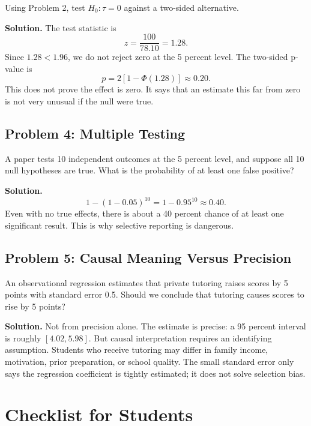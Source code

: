 Using Problem 2, test $H_0:\tau=0$ against a two-sided alternative.

\textbf{Solution.} The test statistic is
\[
  z=\frac{100}{78.10}=1.28.
\]
Since $1.28<1.96$, we do not reject zero at the 5 percent level. The two-sided
p-value is
\[
  p=2[1-\Phi(1.28)]\approx 0.20.
\]
This does not prove the effect is zero. It says that an estimate this far from
zero is not very unusual if the null were true.

\subsection{Problem 4: Multiple Testing}

A paper tests 10 independent outcomes at the 5 percent level, and suppose all
10 null hypotheses are true. What is the probability of at least one false
positive?

\textbf{Solution.}
\[
  1-(1-0.05)^{10}
  =
  1-0.95^{10}
  \approx
  0.40.
\]
Even with no true effects, there is about a 40 percent chance of at least one
significant result. This is why selective reporting is dangerous.

\subsection{Problem 5: Causal Meaning Versus Precision}

An observational regression estimates that private tutoring raises scores by
5 points with standard error 0.5. Should we conclude that tutoring causes
scores to rise by 5 points?

\textbf{Solution.} Not from precision alone. The estimate is precise: a 95
percent interval is roughly $[4.02,5.98]$. But causal interpretation requires
an identifying assumption. Students who receive tutoring may differ in family
income, motivation, prior preparation, or school quality. The small standard
error only says the regression coefficient is tightly estimated; it does not
solve selection bias.

\section{Checklist for Students}

